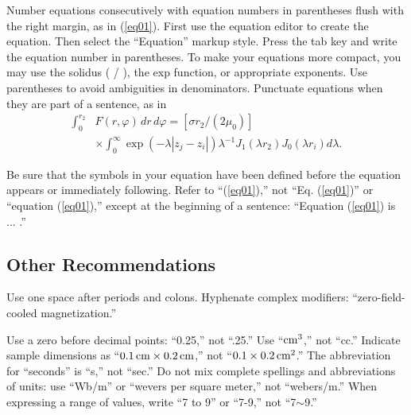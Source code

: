 \documentclass{fullpaper_hutech}
\begin{document}
Number equations consecutively with equation numbers in parentheses flush with the right margin, as in (\ref{eq01}). First use the equation editor to create the equation. Then select the ``Equation'' markup style. Press the tab key and write the equation number in parentheses. To make your equations more compact, you may use the solidus ( / ), the exp function, or appropriate exponents. Use parentheses to avoid ambiguities in denominators. Punctuate equations when they are part of a sentence, as in
\begin{equation}\label{eq01}
\begin{split}\int_0^{r_2} &F(r,\varphi)\,dr\,d\varphi=[\sigma r_2 /(2\mu_0 )] \\
&\times\int_0^{\infty} \exp(-\lambda |z_j -z_i |)\lambda^{-1} J_1 (\lambda r_2 )J_0 (\lambda r_i )d\lambda.\end{split}
\end{equation}

Be sure that the symbols in your equation have been defined before the equation appears or immediately following. Refer to ``(\ref{eq01}),'' not ``Eq. (\ref{eq01})'' or ``equation (\ref{eq01}),'' except at the beginning of a sentence: ``Equation (\ref{eq01}) is ... .''


\subsection{Other Recommendations}

Use one space after periods and colons. Hyphenate complex modifiers: ``zero-field-cooled magnetization.''

Use a zero before decimal points: ``0.25,'' not ``.25.'' Use ``$\rm cm^3$,'' not ``cc.'' Indicate sample dimensions as ``$0.1\,\rm cm\times 0.2\, cm$,'' not ``$0.1\times 0.2\,\rm cm^2$.'' The abbreviation for ``seconds'' is ``s,'' not ``sec.'' Do not mix complete spellings and abbreviations of units: use ``Wb/m'' or ``wevers per square meter,'' not ``webers/m.'' When expressing a range of values, write ``7 to 9'' or ``7-9,'' not ``7$\sim$9.''
\end{document}
